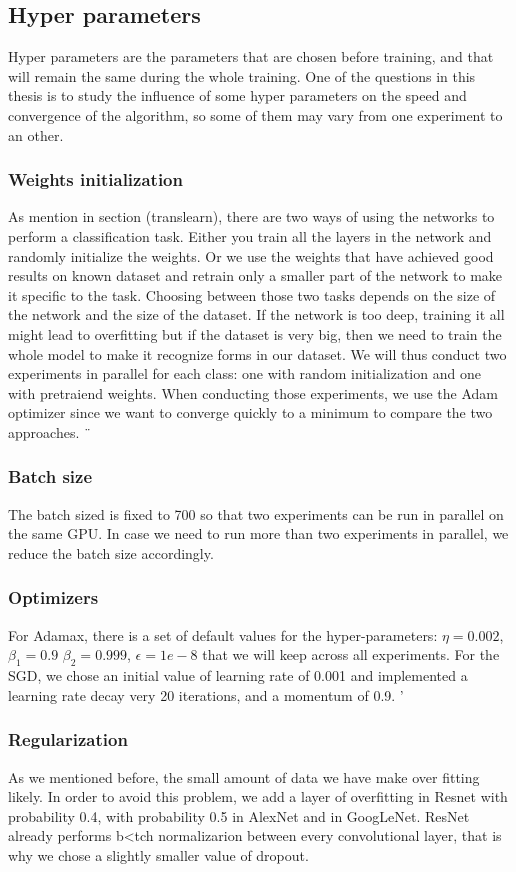 \subsection{Hyper parameters}
Hyper parameters are the parameters that are chosen before training, and that will remain the same during the whole training. One of the questions in this thesis is to study the influence of some hyper parameters on the speed and convergence of the algorithm, so some of them may vary from one experiment to an other. 

\subsubsection{Weights initialization}
As mention in section (translearn), there are two ways of using the networks to perform a classification task. Either you train all the layers in the network and randomly initialize the weights. Or we use the weights that have achieved good results on known dataset and retrain only a smaller part of the network to make it specific to the task.
Choosing between those two tasks depends on the size of the network and the size of the dataset. If the network is too deep, training it all might lead to overfitting but if the dataset is very big, then we need to train the whole model to make it recognize forms in our dataset. 
We will thus conduct two experiments in parallel for each class: one with random initialization and one with pretraiend weights. 
When conducting those experiments, we use the Adam optimizer since we want to converge quickly to a minimum to compare the two approaches. ¨

\subsubsection{Batch size}
The batch sized is fixed to 700 so that two experiments can be run in parallel on the same GPU. In case we need to run more than two experiments in parallel, we reduce the batch size accordingly.

\subsubsection{Optimizers}
For Adamax, there is a set of default values for the hyper-parameters: \(\eta = 0.002\), \(\beta_1 = 0.9\) \(\beta_2 = 0.999\), \(\epsilon = 1e-8\) that we will keep across all experiments.
For the SGD, we chose an initial value of learning rate of 0.001 and implemented a learning rate decay very 20 iterations, and a momentum of 0.9. '

\subsubsection{Regularization}
As we mentioned before, the small amount of data we have make over fitting likely. In order to avoid this problem, we add a layer of overfitting in Resnet with probability 0.4, with probability 0.5 in AlexNet and in GoogLeNet. ResNet already performs b<tch normalizarion between every convolutional layer, that is why we chose a slightly smaller value of dropout. 